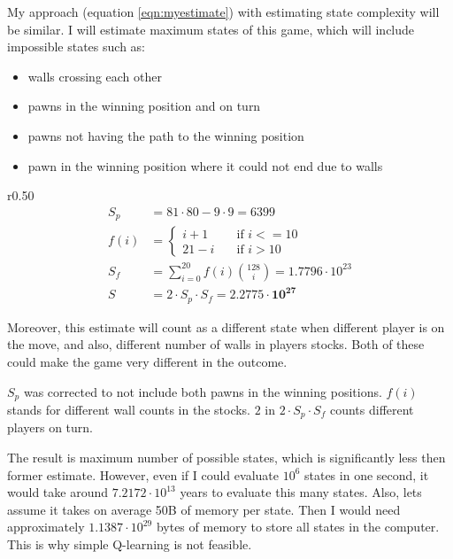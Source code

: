 My approach (equation \ref{eqn:myestimate}) with estimating state complexity
will be similar. I will estimate maximum states of this game, which will
include impossible states such as:
\begin{itemize}
  \vspace*{-0.25cm}
  \setlength\itemsep{0cm}
  \item walls crossing each other
  \item pawns in the winning position and on turn
  \item pawns not having the path to the winning position
  \item pawn in the winning position where it could not end due to walls
  \vspace*{-0.15cm}
\end{itemize}
\begin{wrapfigure}{r}{0.50\textwidth}
  \vspace*{-1.90cm}
  \begin{equation}
    \label{eqn:myestimate}
    \begin{aligned}
      S_p &= 81 {\cdot} 80 - 9 {\cdot} 9 = 6399\\[-0.20cm]
      f(i)\!&=\! \begin{cases}
        i + 1  & \quad \text{if } i <= 10 \\[-0.30cm]
        21 - i & \quad \text{if } i > 10
      \end{cases}\\
      S_f\! &=\! \sum_{i=0}^{20} f(i){128 \choose i} = 1.7796 {\cdot} 10^{23}
      \\
      S &= 2 {\cdot} S_p {\cdot} S_f = \mathbf{2.2775 {\cdot} 10^{27}}
    \end{aligned}
  \end{equation}
  \vspace*{-1.15cm}
\end{wrapfigure}
Moreover, this estimate will count as a different state when different
player is on the move, and also, different number of walls in players
stocks. Both of these could make the game very different in the outcome.

$S_p$ was corrected to not include both pawns in the winning positions.
$f(i)$ %
stands for different wall counts in the stocks.
$2$ in $2{\cdot} S_p {\cdot} S_f$ counts different players on turn.

The result is maximum number of possible states, which is significantly
less then former estimate. However, even if I could evaluate $10^{6}$
states in one second, it would take around $7.2172{\cdot}10^{13}$ years to
evaluate this many states. Also, lets assume it takes on average 50B
of memory per state. Then I would need approximately
$1.1387{\cdot}10^{29}$ bytes of memory to store all states in the
computer. This is why simple Q-learning is not feasible.

